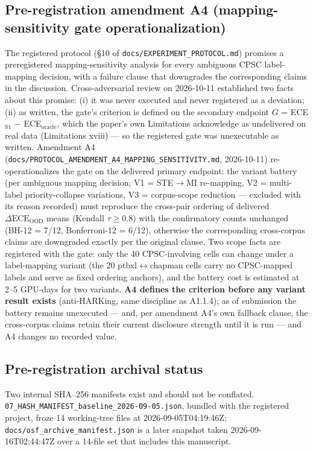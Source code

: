 \documentclass[review,12pt,nonatbib]{elsarticle}
\begin{document}
\subsection{Pre-registration amendment A4 (mapping-sensitivity gate operationalization)}
\label{sec:a4}
The registered protocol (\S10 of
\texttt{docs/EXPERIMENT\_PROTOCOL.md}) promises a preregistered
mapping-sensitivity analysis for every ambiguous CPSC label-mapping
decision, with a failure clause that downgrades the corresponding
claims in the discussion. Cross-adversarial review on 2026-10-11
established two facts about this promise: (i) it was never executed and
never registered as a deviation; (ii) as written, the gate's criterion
is defined on the secondary endpoint $G$ = ECE$_{\text{S1}}$ $-$
ECE$_{\text{oracle}}$, which the paper's own Limitations acknowledge as
undelivered on real data (Limitations xviii) --- so the registered gate
was unexecutable as written. Amendment A4
(\texttt{docs/PROTOCOL\_AMENDMENT\_A4\_}\allowbreak\texttt{MAPPING\_SENSITIVITY.md},
2026-10-11) re-operationalizes the gate on the delivered primary
endpoint: the variant battery (per ambiguous mapping decision;
V1 = STE$\rightarrow$MI re-mapping, V2 = multi-label priority-collapse
variations, V3 = corpus-scope reduction --- excluded with its reason
recorded) must reproduce the cross-pair ordering of delivered
$\Delta\text{ECE}_{\text{OOD}}$ means (Kendall $\tau \geq 0.8$) with the
confirmatory counts unchanged (BH-12 = 7/12, Bonferroni-12 = 6/12),
otherwise the corresponding cross-corpus claims are downgraded exactly
per the original clause. Two scope facts are registered with the gate:
only the 40 CPSC-involving cells can change under a label-mapping
variant (the 20 ptbxl$\leftrightarrow$chapman cells carry no CPSC-mapped
labels and serve as fixed ordering anchors), and the battery cost is
estimated at 2--5 GPU-days for two variants. \textbf{A4 defines the
criterion before any variant result exists} (anti-HARKing, same
discipline as A1.1.4); as of submission the battery remains
unexecuted --- and, per amendment A4's own fallback clause, the
cross-corpus claims retain their current disclosure strength until it
is run --- and A4 changes no recorded value.

\subsection{Pre-registration archival status}
\label{sec:archival-status}
Two internal SHA--256 manifests exist and should not be conflated.
\texttt{07\_HASH\_MANIFEST\_baseline\_2026-09-05.json}, bundled with the
registered project, froze 14 working-tree files at
2026-09-05T04:19:46Z; \texttt{docs/osf\_archive\_manifest.json} is a later
snapshot taken 2026-09-16T02:44:47Z over a 14-file set that includes this
manuscript.
\end{document}
